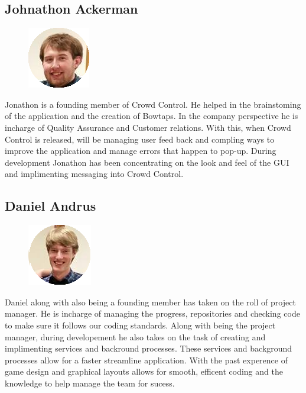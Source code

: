 \subsection{Johnathon Ackerman}
\begin{figure}
\includegraphics{johnnathonackerman}
\end{figure}
Jonathon is a founding member of Crowd Control. He helped in the brainstoming of the application and the creation of Bowtaps. In the company perspective he is incharge of Quality Assurance and Customer relations. With this, when Crowd Control is released, will be managing user feed back and compling ways to improve the application and manage errors that happen to pop-up. During development Jonathon has been concentrating on the look and feel of the GUI and implimenting messaging into Crowd Control. 
\newline
\newline
\newline
\newline
\newline
\newline
\newline


\noindent
\subsection{Daniel Andrus}
\begin{figure}
\includegraphics{danielandrus}
\end{figure}
Daniel along with also being a founding member has taken on the roll of project manager. He is incharge of managing the progress, repositories and checking code to make sure it follows our coding standards. Along with being the project manager, during developement he also takes on the task of creating and implimenting services and backround processes. These services and background processes allow for a faster streamline application. With the past experence of game design and graphical layouts allows for smooth, efficent coding and the knowledge to help manage the team for sucess.
\newline
\newline
\newline
\newline
\newline

